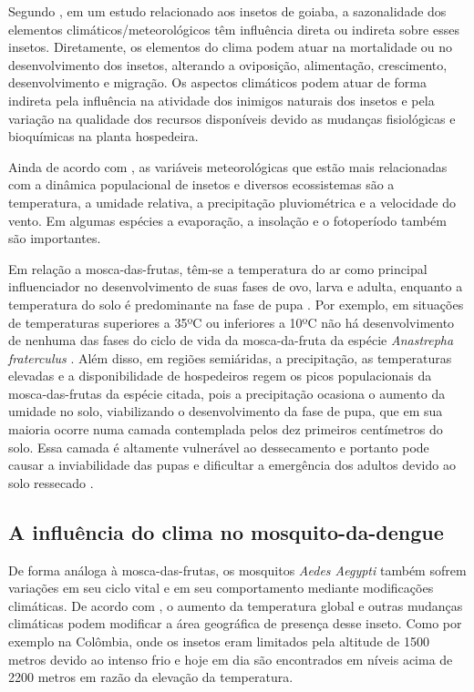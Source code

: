 Segundo , em um estudo relacionado aos insetos de goiaba, a sazonalidade dos elementos climáticos/meteorológicos têm influência direta ou indireta sobre esses insetos. Diretamente, os elementos do clima podem atuar na mortalidade ou no desenvolvimento dos insetos, alterando a oviposição, alimentação, crescimento, desenvolvimento e migração. Os aspectos climáticos podem atuar de forma indireta pela influência na atividade dos inimigos naturais dos insetos e pela variação na qualidade dos recursos disponíveis devido as mudanças fisiológicas e bioquímicas na planta hospedeira.

Ainda de acordo com , as variáveis meteorológicas que estão mais relacionadas com a dinâmica populacional de insetos e diversos ecossistemas são a temperatura, a umidade relativa, a precipitação pluviométrica e a velocidade do vento. Em algumas espécies a evaporação, a insolação e o fotoperíodo também são importantes.

Em relação a mosca-das-frutas, têm-se a temperatura do ar como principal influenciador no desenvolvimento de suas fases de ovo, larva e adulta, enquanto a temperatura do solo é predominante na fase de pupa \cite{garcia1998influencia}. Por exemplo, em situações de temperaturas superiores a 35ºC ou inferiores a 10ºC não há desenvolvimento de nenhuma das fases do ciclo de vida da mosca-da-fruta da espécie \textit{Anastrepha fraterculus} \cite{araujo2008levantamento}. Além disso, em regiões semiáridas, a precipitação, as temperaturas elevadas e a disponibilidade de hospedeiros regem os picos populacionais da mosca-das-frutas da espécie citada, pois a precipitação ocasiona o aumento da umidade no solo, viabilizando o desenvolvimento da fase de pupa, que em sua maioria ocorre numa camada contemplada pelos dez primeiros centímetros do solo. Essa camada é altamente vulnerável ao dessecamento e portanto pode causar a inviabilidade das pupas e dificultar a emergência dos adultos devido ao solo ressecado \cite{calore2013fatores, araujo2008levantamento}.

\subsection{A influência do clima no mosquito-da-dengue}

De forma análoga à mosca-das-frutas, os mosquitos \textit{Aedes Aegypti} também sofrem variações em seu ciclo vital e em seu comportamento mediante modificações climáticas. De acordo com , o aumento da temperatura global e outras mudanças climáticas podem modificar a área geográfica de presença desse inseto. Como por exemplo na Colômbia, onde os insetos eram limitados pela altitude de 1500 metros devido ao intenso frio e hoje em dia são encontrados em níveis acima de 2200 metros em razão da elevação da temperatura.
 
